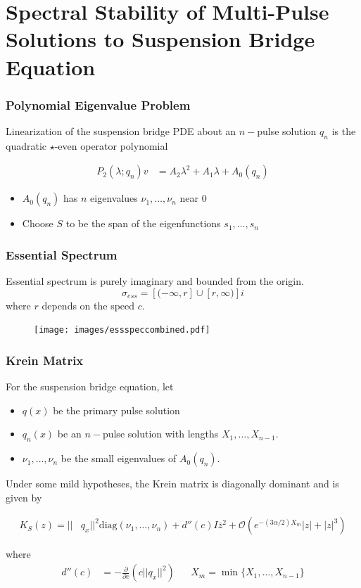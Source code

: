 \documentclass[16pt]{beamer}
\begin{document}
\section{Spectral Stability of Multi-Pulse Solutions to Suspension Bridge Equation}

\begin{frame}
\frametitle{Polynomial Eigenvalue Problem}
	Linearization of the suspension bridge PDE about an $n-$pulse solution $q_n$ is the quadratic $\star$-even operator polynomial

    \begin{align*}
    P_2(\lambda; q_n)v &= A_2 \lambda^2 + A_1 \lambda + A_0(q_n)
    \end{align*}

    \begin{itemize}
    \item $A_0(q_n)$ has $n$ eigenvalues $\nu_1, \dots, \nu_n$ near 0
    \item Choose $S$ to be the span of the eigenfunctions $s_1, \dots, s_n$
	\end{itemize}

\end{frame}

\begin{frame}
\frametitle{Essential Spectrum}
	Essential spectrum is purely imaginary and bounded from the origin.
	\[ \sigma_{ess} = [ (-\infty, r] \cup [r, \infty) ]i \]
	where $r$ depends on the speed $c$.
	\begin{figure}
	\begin{center}
	\texttt{[image: images/essspeccombined.pdf]}
	\end{center}
	\end{figure}
\end{frame}

\begin{frame}
\frametitle{Krein Matrix}
	\begin{theorem}[Kapitula et al., 2019]
	For the suspension bridge equation, let
	\begin{itemize}
		\item $q(x)$ be the primary pulse solution
		\item $q_n(x)$ be an $n-$pulse solution with lengths $X_1, \dots, X_{n-1}$. 
		\item $\nu_1, \dots, \nu_n$ be the small eigenvalues of $A_0(q_n)$.
	\end{itemize} 
	Under some mild hypotheses, the Krein matrix is diagonally dominant and is given by

    \begin{align*}\label{Kreinapprox}
    K_S(z) = ||&q_x||^2 \text{diag} (\nu_1, \dots, \nu_n) 
     + d''(c) I \overline{z}^2 + \mathcal{O}(e^{-(3 \alpha/2) X_m}|z| + |z|^3)
    \end{align*}

    where
    \vspace{-1.5ex}
    \begin{align*}
    d''(c) &= -\frac{\partial}{\partial c} \left( c ||q_x||^2 \right)  &&
    X_m = \min\{ X_1, \dots, X_{n-1} \} 
    \end{align*}
	\end{theorem}
\end{frame}
\end{document}
